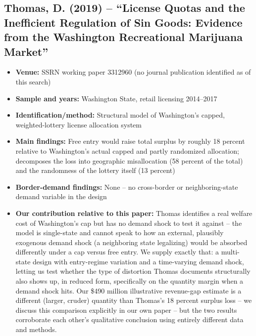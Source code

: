 \documentclass[11pt]{article}
\begin{document}
\subsection{Thomas, D. (2019) -- ``License Quotas and the Inefficient Regulation of Sin Goods: Evidence from
the Washington Recreational Marijuana Market''}
\begin{itemize}
\item \textbf{Venue:} SSRN working paper 3312960 (no journal publication identified as of this search)
\item \textbf{Sample and years:} Washington State, retail licensing 2014--2017
\item \textbf{Identification/method:} Structural model of Washington's capped, weighted-lottery license
allocation system
\item \textbf{Main findings:} Free entry would raise total surplus by roughly 18 percent relative to
Washington's actual capped and partly randomized allocation; decomposes the loss into geographic
misallocation (58 percent of the total) and the randomness of the lottery itself (13 percent)
\item \textbf{Border-demand findings:} None -- no cross-border or neighboring-state demand variable in the
design
\item \textbf{Our contribution relative to this paper:} Thomas identifies a real welfare cost of Washington's
cap but has no demand shock to test it against -- the model is single-state and cannot speak to how an
external, plausibly exogenous demand shock (a neighboring state legalizing) would be absorbed differently
under a cap versus free entry. We supply exactly that: a multi-state design with entry-regime variation and a
time-varying demand shock, letting us test whether the type of distortion Thomas documents structurally also
shows up, in reduced form, specifically on the quantity margin when a demand shock hits. Our \$490 million
illustrative revenue-gap estimate is a different (larger, cruder) quantity than Thomas's 18 percent surplus
loss -- we discuss this comparison explicitly in our own paper -- but the two results corroborate each other's
qualitative conclusion using entirely different data and methods.
\end{itemize}
\end{document}
